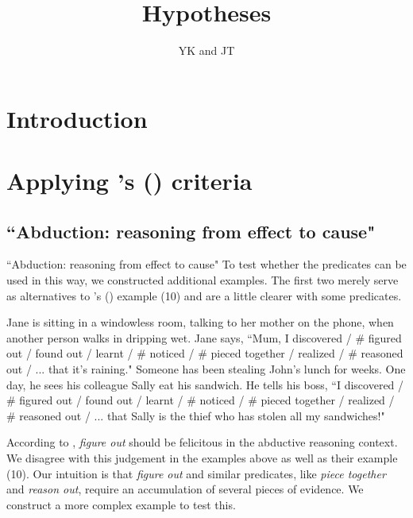 \documentclass[11pt,fleqn]{article}
\title{Hypotheses}
\author{YK and JT}
\newcommand{\6}{\mbox{$[\hspace*{-.6mm}[$}}
\newcommand{\9}{\mbox{$]\hspace*{-.6mm}]$}}
\newcommand{\citepos}[1]{\citeauthor{#1}'s (\citeyear{#1})}
\begin{document}
\maketitle

\section{Introduction}


\section{Applying \citepos{korotkova-anand-dgfs2024} criteria}
\subsection{``Abduction: reasoning from effect to cause"}
``Abduction: reasoning from effect to cause"
To test whether the predicates can be used in this way, we constructed additional examples. The first two merely serve as alternatives to \citepos{korotkova-anand-dgfs2024} example (10) and are a little clearer with some predicates.

\begin{exe}		
	\ex Jane is sitting in a windowless room, talking to her mother on the phone, when another person walks in dripping wet. Jane says, ``Mum, I discovered / \# figured out / found out / learnt / \# noticed /  \# pieced together / realized / \# reasoned out / ... that it's raining."
	\ex Someone has been stealing John's lunch for weeks. One day, he sees his colleague Sally eat his sandwich. He tells his boss, ``I discovered / \# figured out / found out / learnt / \# noticed /  \# pieced together / realized / \# reasoned out / ... that Sally is the thief who has stolen all my sandwiches!"
\end{exe}

According to \cite{korotkova-anand-dgfs2024}, \emph{figure out} should be felicitous in the abductive reasoning context. We disagree with this judgement in the examples above as well as their example (10). Our intuition is that \emph{figure out} and similar predicates, like \emph{piece together} and \emph{reason out}, require an accumulation of several pieces of evidence. We construct a more complex example to test this. 
\end{document}
